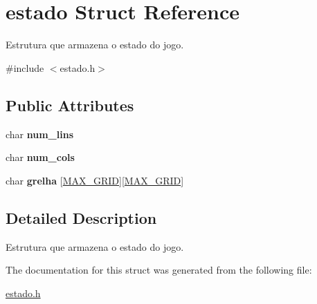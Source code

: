 \hypertarget{structestado}{\section{estado Struct Reference}
\label{structestado}
}


Estrutura que armazena o estado do jogo.  




{\ttfamily \#include $<$estado.\+h$>$}

\subsection*{Public Attributes}
\begin{DoxyCompactItemize}
\item 
\hypertarget{structestado_ad19bdc6f740e859b32842b985d4871de}{char {\bfseries num\+\_\+lins}}\label{structestado_ad19bdc6f740e859b32842b985d4871de}

\item 
\hypertarget{structestado_a1a110cae8b3c47549ee993413cccc4a3}{char {\bfseries num\+\_\+cols}}\label{structestado_a1a110cae8b3c47549ee993413cccc4a3}

\item 
\hypertarget{structestado_a7d72f243f07d0d277f24e15e28a9a7b2}{char {\bfseries grelha} \mbox{[}\hyperlink{estado_8h_ab02e1c5c6948bf8cf3c21a0acad8a578}{M\+A\+X\+\_\+\+G\+R\+I\+D}\mbox{]}\mbox{[}\hyperlink{estado_8h_ab02e1c5c6948bf8cf3c21a0acad8a578}{M\+A\+X\+\_\+\+G\+R\+I\+D}\mbox{]}}\label{structestado_a7d72f243f07d0d277f24e15e28a9a7b2}

\end{DoxyCompactItemize}


\subsection{Detailed Description}
Estrutura que armazena o estado do jogo. 

The documentation for this struct was generated from the following file\+:\begin{DoxyCompactItemize}
\item 
\hyperlink{estado_8h}{estado.\+h}\end{DoxyCompactItemize}
